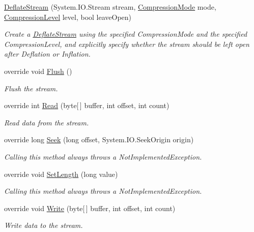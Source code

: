 \begin{DoxyCompactItemize}
\mbox{\hyperlink{class_super_tiled2_unity_1_1_ionic_1_1_zlib_1_1_deflate_stream_aa6c5b210ece24e5d135767c2f9165090}{Deflate\+Stream}} (System.\+I\+O.\+Stream stream, \mbox{\hyperlink{namespace_super_tiled2_unity_1_1_ionic_1_1_zlib_ad5b7635d92497e1c905e5de82eb1c6b1}{Compression\+Mode}} mode, \mbox{\hyperlink{namespace_super_tiled2_unity_1_1_ionic_1_1_zlib_a20f6771804996c363f454ad9765cd7db}{Compression\+Level}} level, bool leave\+Open)
\begin{DoxyCompactList}\small\item\em Create a {\ttfamily \mbox{\hyperlink{class_super_tiled2_unity_1_1_ionic_1_1_zlib_1_1_deflate_stream}{Deflate\+Stream}}} using the specified {\ttfamily Compression\+Mode} and the specified {\ttfamily Compression\+Level}, and explicitly specify whether the stream should be left open after Deflation or Inflation. \end{DoxyCompactList}\item 
override void \mbox{\hyperlink{class_super_tiled2_unity_1_1_ionic_1_1_zlib_1_1_deflate_stream_a5c891796c2fa4b363c95e7c8462e0858}{Flush}} ()
\begin{DoxyCompactList}\small\item\em Flush the stream. \end{DoxyCompactList}\item 
override int \mbox{\hyperlink{class_super_tiled2_unity_1_1_ionic_1_1_zlib_1_1_deflate_stream_a7adaf1072e4bc9be5914923eb2bc0636}{Read}} (byte\mbox{[}$\,$\mbox{]} buffer, int offset, int count)
\begin{DoxyCompactList}\small\item\em Read data from the stream. \end{DoxyCompactList}\item 
override long \mbox{\hyperlink{class_super_tiled2_unity_1_1_ionic_1_1_zlib_1_1_deflate_stream_ad9ab23f68bc213982d6d5f7197241c7e}{Seek}} (long offset, System.\+I\+O.\+Seek\+Origin origin)
\begin{DoxyCompactList}\small\item\em Calling this method always throws a Not\+Implemented\+Exception. \end{DoxyCompactList}\item 
override void \mbox{\hyperlink{class_super_tiled2_unity_1_1_ionic_1_1_zlib_1_1_deflate_stream_a858dc9267970f954e56efd4711fad616}{Set\+Length}} (long value)
\begin{DoxyCompactList}\small\item\em Calling this method always throws a Not\+Implemented\+Exception. \end{DoxyCompactList}\item 
override void \mbox{\hyperlink{class_super_tiled2_unity_1_1_ionic_1_1_zlib_1_1_deflate_stream_a751d2c556423679f9267bc2a45ce3539}{Write}} (byte\mbox{[}$\,$\mbox{]} buffer, int offset, int count)
\begin{DoxyCompactList}\small\item\em Write data to the stream. \end{DoxyCompactList}\end{DoxyCompactItemize}
